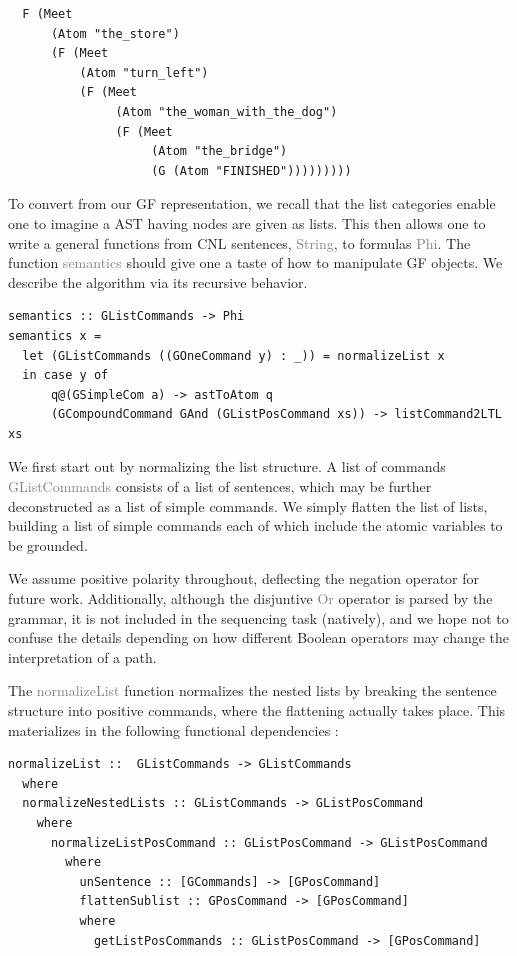\documentclass[a4paper, 11pt]{article}
\newcommand{\gray}[1]{\textcolor{gray}{#1}}
\begin{document}
\begin{verbatim}
  F (Meet 
      (Atom "the_store") 
      (F (Meet 
          (Atom "turn_left") 
          (F (Meet 
               (Atom "the_woman_with_the_dog") 
               (F (Meet 
                    (Atom "the_bridge") 
                    (G (Atom "FINISHED")))))))))
\end{verbatim}

To convert from our GF representation, we recall that the list categories enable
one to imagine a AST having nodes are given as lists. This then allows one to
write a general functions from CNL sentences, \gray{String}, to formulas
\gray{Phi}. The function \gray{semantics} should give one a taste of how to
manipulate GF objects. We describe the algorithm via its recursive behavior.

\begin{verbatim}
semantics :: GListCommands -> Phi
semantics x =
  let (GListCommands ((GOneCommand y) : _)) = normalizeList x
  in case y of
      q@(GSimpleCom a) -> astToAtom q
      (GCompoundCommand GAnd (GListPosCommand xs)) -> listCommand2LTL xs
\end{verbatim}

We first start out by normalizing the list structure. A list of commands
\gray{GListCommands} consists of a list of sentences, which may be further
deconstructed as a list of simple commands. We simply flatten the list of lists,
building a list of simple commands each of which include the atomic variables to
be grounded.

We assume positive polarity throughout, deflecting the negation operator for
future work. Additionally, although the disjuntive \gray{Or} operator is parsed
by the grammar, it is not included in the sequencing task (natively), and we
hope not to confuse the details depending on how different Boolean operators may
change the interpretation of a path.

The \gray{normalizeList} function normalizes the nested lists by breaking the sentence
structure into positive commands, where the flattening actually takes place.
This materializes in the following functional dependencies :

\begin{verbatim}
normalizeList ::  GListCommands -> GListCommands
  where
  normalizeNestedLists :: GListCommands -> GListPosCommand
    where
      normalizeListPosCommand :: GListPosCommand -> GListPosCommand
        where
          unSentence :: [GCommands] -> [GPosCommand]
          flattenSublist :: GPosCommand -> [GPosCommand]
          where
            getListPosCommands :: GListPosCommand -> [GPosCommand]
\end{verbatim}
\end{document}
